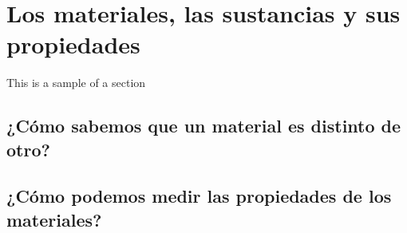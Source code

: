 \thispagestyle{plain}
\section{Los materiales, las sustancias y sus propiedades}
This is a sample of a section
\subsection{¿Cómo sabemos que un material es distinto de otro?}
\subsection{¿Cómo podemos medir las propiedades de los materiales?}
\newpage